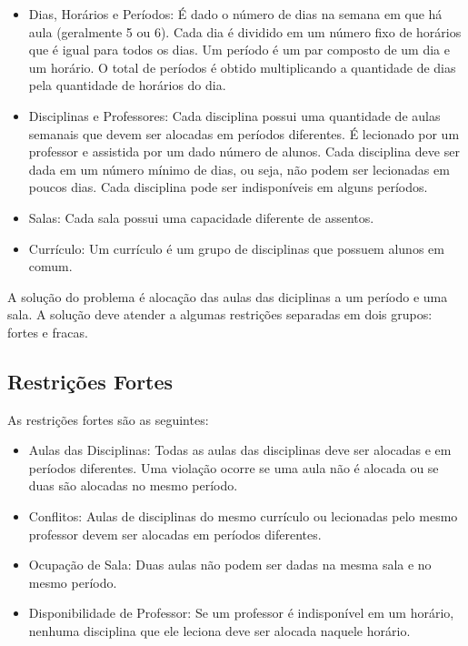 \documentclass[11pt]{article}
\begin{document}
\begin{itemize}

\item Dias, Horários e Períodos: É dado o número de dias na semana em que há aula (geralmente 5 ou 6). Cada dia é dividido em um número fixo de horários que é igual para todos os dias. Um período é um par composto de um dia e um horário. O total de períodos é obtido multiplicando a quantidade de dias pela quantidade de horários do dia.

\item Disciplinas e Professores: Cada disciplina possui uma quantidade de aulas semanais que devem ser alocadas em períodos diferentes. É lecionado por um professor e assistida por um dado número de alunos. Cada disciplina deve ser dada em um número mínimo de dias, ou seja, não podem ser lecionadas em poucos dias. Cada disciplina pode ser indisponíveis em alguns períodos.

\item Salas: Cada sala possui uma capacidade diferente de assentos.

\item Currículo: Um currículo é um grupo de disciplinas que possuem alunos em comum.

\end{itemize}

A solução do problema é alocação das aulas das diciplinas a um período e uma sala. A solução deve atender a algumas restrições separadas em dois grupos: fortes e fracas.

\subsection{Restrições Fortes}

As restrições fortes são as seguintes:

\begin{itemize}

\item Aulas das Disciplinas: Todas as aulas das disciplinas deve ser alocadas e em períodos diferentes. Uma violação ocorre se uma aula não é alocada ou se duas são alocadas no mesmo período.

\item Conflitos: Aulas de disciplinas do mesmo currículo ou lecionadas pelo mesmo professor devem ser alocadas em períodos diferentes. 

\item Ocupação de Sala: Duas aulas não podem ser dadas na mesma sala e no mesmo período.

\item Disponibilidade de Professor: Se um professor é indisponível em um horário, nenhuma disciplina que ele leciona deve ser alocada naquele horário.

\end{itemize}
\end{document}
